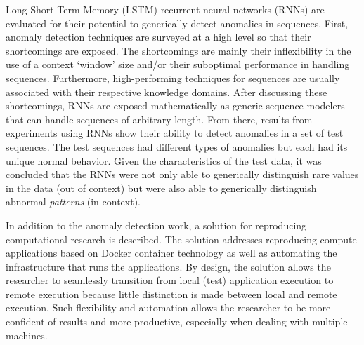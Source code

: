 \documentclass[11 pt]{report}
\begin{document}

\tableofcontents

\listoftables

\listoffigures



\abstractpage

Long Short Term Memory (LSTM) recurrent neural networks (RNNs) are evaluated for their potential to generically detect anomalies in sequences.
%
First, anomaly detection techniques are surveyed at a high level so that their shortcomings are exposed.
%
The shortcomings are mainly their inflexibility in the use of a context `window' size and/or their suboptimal performance in handling sequences.
%
Furthermore, high-performing techniques for sequences are usually associated with their respective knowledge domains.
%
After discussing these shortcomings, RNNs are exposed mathematically as generic sequence modelers that can handle sequences of arbitrary length.
%
From there, results from experiments using RNNs show their ability to detect anomalies in a set of test sequences.
%
The test sequences had different types of anomalies but each had its unique normal behavior.
%
Given the characteristics of the test data, it was concluded that the RNNs were not only able to generically distinguish rare values in the data (out of context) but were also able to generically distinguish abnormal \emph{patterns} (in context).

\abstractmultiplepage
In addition to the anomaly detection work, a solution for reproducing computational research is described.
%
The solution addresses reproducing compute applications based on \textsf{Docker} container technology as well as automating the infrastructure that runs the applications.
%
By design, the solution allows the researcher to seamlessly transition from local (test) application execution to remote execution because little distinction is made between local and remote execution.
%
Such flexibility and automation allows the researcher to be more confident of results and more productive, especially when dealing with multiple machines.

\startofchapters





\end{document}
